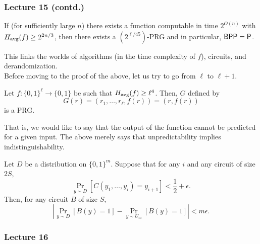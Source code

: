 	\subsubsection{Lecture 15 (contd.)}

		\begin{ftheo}
			\label{theo: hard to prg}
			If (for sufficiently large $n$) there exists a function computable in time $2^{O(n)}$ with $H_{\text{avg}}(f) \ge 2^{2n/3}$, then there exists a $(2^{\ell/45})$-PRG and in particular, $\mathsf{BPP} = \mathsf{P}$.
		\end{ftheo}
		This links the worlds of algorithms (in the time complexity of $f$), circuits, and derandomization.\\

		Before moving to the proof of the above, let us try to go from $\ell$ to $\ell+1$.

		\begin{prop}
			Let $f : \{0,1\}^\ell \to \{0,1\}$ be such that $H_{\text{avg}}(f) \ge \ell^4$. Then, $G$ defined by
			\[ G(r) = (r_1,\ldots,r_\ell,f(r)) = (r,f(r)) \]
			is a PRG.
		\end{prop}
		That is, we would like to say that the output of the function cannot be predicted for a given input. The above merely says that unpredictability implies indistinguishability.



		\begin{ftheo}
			\label{yao}
			Let $D$ be a distribution on $\{0,1\}^m$. Suppose that for any $i$ and any circuit of size $2S$,
			\[ \Pr_{y \sim D} [C(y_1,\ldots,y_i) = y_{i+1}] < \frac{1}{2} + \epsilon. \]
			Then, for any circuit $B$ of size $S$,
			\[ \left| \Pr_{y \sim D} [B(y) = 1] - \Pr_{y \sim U_m}[B(y) = 1] \right| < m\epsilon. \]
		\end{ftheo}

	\subsubsection{Lecture 16}

